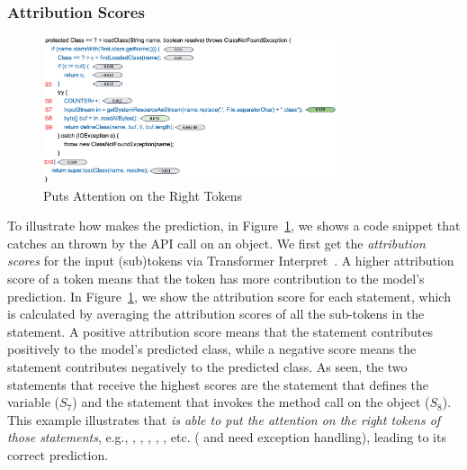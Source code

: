 \subsubsection{Attribution Scores}

\begin{figure}[t]
 	\centering
 	\includegraphics[width=3.4in]{rq1-case-study.png}
        \vspace{-20pt}
 	\caption{{\xblock} Puts Attention on the Right Tokens}
 	\label{fig:rq1-case}	
\end{figure}


To illustrate how {\xblock} makes the prediction, in
Figure~\ref{fig:rq1-case}, we shows a code snippet that catches an
 thrown by the  API call on an
 object.
%
We first get the {\em attribution scores} for the input (sub)tokens
via Transformer Interpret~\cite{transformers-interpret}. A higher
attribution score of a token means that the token has more
contribution to the model's prediction. In Figure~\ref{fig:rq1-case},
we show the attribution score for each statement, which is calculated
by averaging the attribution scores of all the sub-tokens in the
statement.
%
%
A positive attribution score means that the statement contributes
positively to the model's predicted class, while a negative score
means the statement contributes negatively to the predicted class.  As
seen, the two statements that receive the highest scores are the
statement that defines the  variable ($S_7$) and the
statement that invokes the  method call on the
 object ($S_8$). This example illustrates that {\em {\tool}
  is able to put the attention on the right tokens of those
  statements}, e.g., , , ,
, , etc. ( and  need exception handling), leading to its correct prediction.


